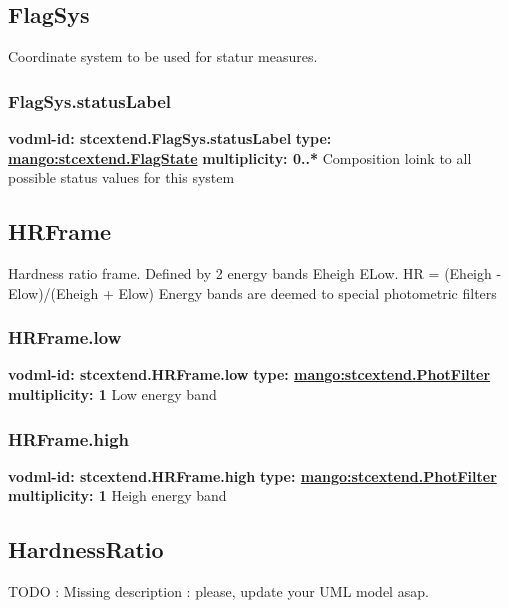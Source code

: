   \subsection{FlagSys}
  \label{sect:stcextend.FlagSys}
    Coordinate system to be used for statur measures.

    \subsubsection{FlagSys.statusLabel}
      \textbf{vodml-id: stcextend.FlagSys.statusLabel} \newline
      \textbf{type: \hyperref[sect:stcextend.FlagState]{mango:stcextend.FlagState}} \newline
      \textbf{multiplicity: 0..*} \newline 
      Composition loink to all possible status values for this system

  \subsection{HRFrame}
  \label{sect:stcextend.HRFrame}
    Hardness ratio frame. Defined by 2 energy bands Eheigh ELow. HR = (Eheigh - Elow)/(Eheigh + Elow) Energy bands are deemed to special photometric filters

    \subsubsection{HRFrame.low}
      \textbf{vodml-id: stcextend.HRFrame.low} \newline
      \textbf{type: \hyperref[sect:stcextend.PhotFilter]{mango:stcextend.PhotFilter}} \newline
      \textbf{multiplicity: 1} \newline 
      Low energy band

    \subsubsection{HRFrame.high}
      \textbf{vodml-id: stcextend.HRFrame.high} \newline
      \textbf{type: \hyperref[sect:stcextend.PhotFilter]{mango:stcextend.PhotFilter}} \newline
      \textbf{multiplicity: 1} \newline 
      Heigh energy band

  \subsection{HardnessRatio}
  \label{sect:stcextend.HardnessRatio}
    TODO : Missing description : please, update your UML model asap.

